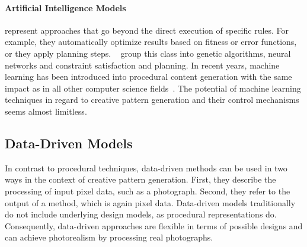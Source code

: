 

\paragraph*{Artificial Intelligence Models} represent approaches that go beyond the direct execution of specific rules. For example, they automatically optimize results based on fitness or error functions, or they apply planning steps. \citeauthor*{hendrikx_2013_pcg}~\cite{hendrikx_2013_pcg} group this class into genetic algorithms, neural networks and constraint satisfaction and planning. In recent years, machine learning has been introduced into procedural content generation with the same impact as in all other computer science fields~\cite{summerville_2017_pcg}. The potential of machine learning techniques in regard to creative pattern generation and their control mechanisms seems almost limitless.



\subsection[Data-Driven]{Data-Driven Models}
\label{subsec:design_models_datadriven}

In contrast to procedural techniques, data-driven methods can be used in two ways in the context of creative pattern generation. First, they describe the processing of input pixel data, such as a photograph. Second, they refer to the output of a method, which is again pixel data. Data-driven models traditionally do not include underlying design models, as procedural representations do. Consequently, data-driven approaches are flexible in terms of possible designs and can achieve photorealism by processing real photographs.

